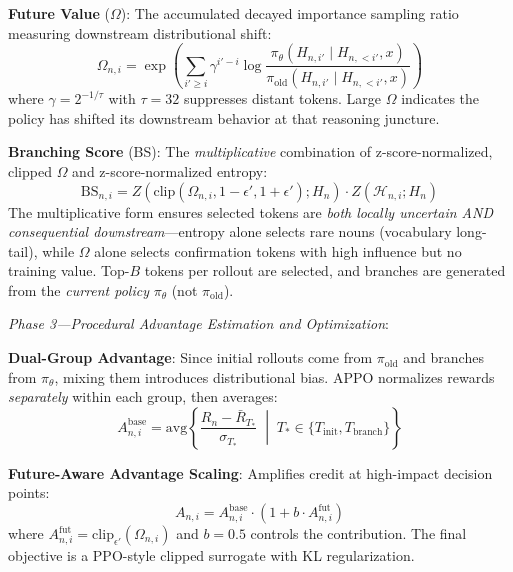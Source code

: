 \documentclass[11pt,a4paper]{article}
\begin{document}
\textbf{Future Value} ($\Omega$): The accumulated decayed importance sampling ratio measuring downstream distributional shift:
\begin{equation}
\Omega_{n,i} = \exp\!\left(\sum_{i' \geq i} \gamma^{i'-i} \log \frac{\pi_\theta(H_{n,i'} \mid H_{n,<i'}, x)}{\pi_{\mathrm{old}}(H_{n,i'} \mid H_{n,<i'}, x)}\right)
\end{equation}
where $\gamma = 2^{-1/\tau}$ with $\tau\!=\!32$ suppresses distant tokens. Large $\Omega$ indicates the policy has shifted its downstream behavior at that reasoning juncture.

\textbf{Branching Score} (BS): The \emph{multiplicative} combination of z-score-normalized, clipped $\Omega$ and z-score-normalized entropy:
\begin{equation}
\mathrm{BS}_{n,i} = Z\!\left(\mathrm{clip}(\Omega_{n,i}, 1\!-\!\epsilon', 1\!+\!\epsilon'); H_n\right) \cdot Z\!\left(\mathcal{H}_{n,i}; H_n\right)
\end{equation}
The multiplicative form ensures selected tokens are \emph{both locally uncertain AND consequential downstream}---entropy alone selects rare nouns (vocabulary long-tail), while $\Omega$ alone selects confirmation tokens with high influence but no training value. Top-$B$ tokens per rollout are selected, and branches are generated from the \emph{current policy} $\pi_\theta$ (not $\pi_{\mathrm{old}}$).

\emph{Phase 3---Procedural Advantage Estimation and Optimization}:

\textbf{Dual-Group Advantage}: Since initial rollouts come from $\pi_{\mathrm{old}}$ and branches from $\pi_\theta$, mixing them introduces distributional bias. APPO normalizes rewards \emph{separately} within each group, then averages:
\begin{equation}
A^{\mathrm{base}}_{n,i} = \mathrm{avg}\left\{\frac{R_n - \bar{R}_{T_*}}{\sigma_{T_*}} \;\middle|\; T_* \in \{T_{\mathrm{init}}, T_{\mathrm{branch}}\}\right\}
\end{equation}

\textbf{Future-Aware Advantage Scaling}: Amplifies credit at high-impact decision points:
\begin{equation}
A_{n,i} = A^{\mathrm{base}}_{n,i} \cdot (1 + b \cdot A^{\mathrm{fut}}_{n,i})
\end{equation}
where $A^{\mathrm{fut}}_{n,i} = \mathrm{clip}_{\epsilon'}(\Omega_{n,i})$ and $b\!=\!0.5$ controls the contribution. The final objective is a PPO-style clipped surrogate with KL regularization.
\end{document}
